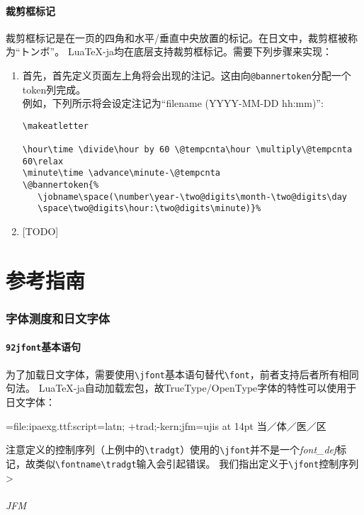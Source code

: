 \documentclass{ltjarticle}
\DeclareRobustCommand\LuaTeX{Lua\TeX}
\DeclareRobustCommand\pLaTeX{p\kern-.05em\LaTeX}
\begin{document}
\subsection{裁剪框标记}
裁剪框标记是在一页的四角和水平/垂直中央放置的标记。在日文中，裁剪框被称为“トンボ”。
\LuaTeX-ja均在底层支持裁剪框标记。需要下列步骤来实现：
\begin{enumerate}
\item 首先，首先定义页面左上角将会出现的注记。这由向\verb!@bannertoken!分配一个token列完成。\\
例如，下列所示将会设定注记为“\textsf{filename (YYYY-MM-DD hh:mm)}”:

\begin{verbatim}
\makeatletter

\hour\time \divide\hour by 60 \@tempcnta\hour \multiply\@tempcnta 60\relax
\minute\time \advance\minute-\@tempcnta
\@bannertoken{%
   \jobname\space(\number\year-\two@digits\month-\two@digits\day
   \space\two@digits\hour:\two@digits\minute)}%
\end{verbatim}

\item {[TODO]}
\end{enumerate}
\part{参考指南}
\section{字体测度和日文字体}
\subsection{\texttt{\char92jfont}基本语句}
为了加载日文字体，需要使用\verb!\jfont!基本语句替代\verb!\font!，前者支持后者所有相同句法。
\LuaTeX-ja自动加载宏包，故TrueType/OpenType字体的特性可以使用于日文字体：
\begin{LTXexample}
\jfont\tradgt={file:ipaexg.ttf:script=latn;%
  +trad;-kern;jfm=ujis} at 14pt
\tradgt{}当／体／医／区
\end{LTXexample}

注意定义的控制序列（上例中的\verb!\tradgt!）使用的\verb!\jfont!并不是一个\textit{font\_def}标记，故类似\verb!\fontname\tradgt!输入会引起错误。
我们指出定义于\verb!\jfont!控制序列>
\paragraph{JFM}
\end{document}
